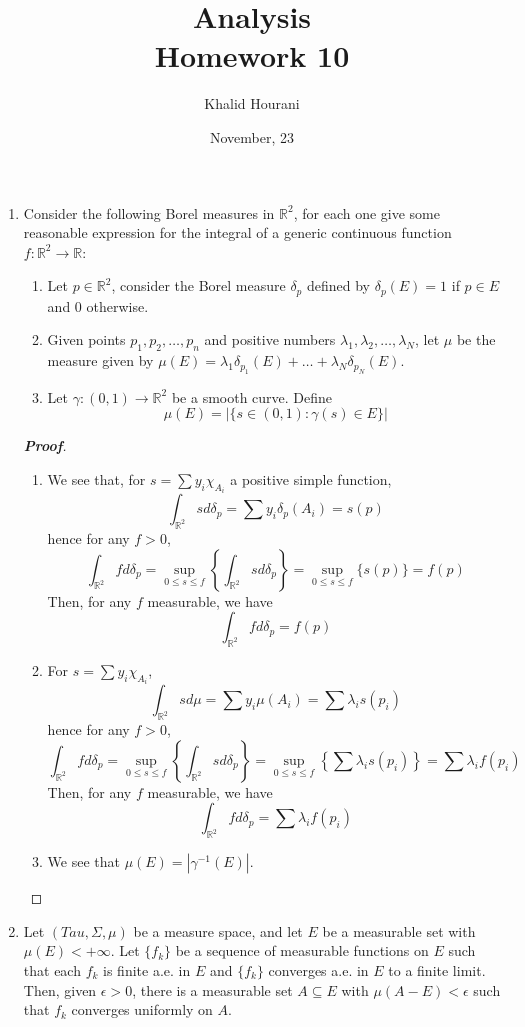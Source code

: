 \documentclass[12pt,leqno]{book}
\title{Analysis\\Homework 10}
\date{November, 23}
\author{Khalid Hourani}
\theoremstyle{definition}
\newcommand{\R}{\mathbb{R}}
\newenvironment{Proof}{\begin{proof}[\textnormal{\textbf{Proof}}]}{\end{proof}}
\begin{document}
\begin{titlepage}
 \maketitle\thispagestyle{empty}
\end{titlepage}
\thispagestyle{empty}
\clearpage\mbox{}\clearpage

\setcounter{page}{1}
\begin{enumerate}
 \item Consider the following Borel measures in $\R^2$, for each one give some reasonable expression for the integral of a generic continuous function $f:\R^2\to\R$:
\begin{enumerate}
 \item Let $p\in\R^2$, consider the Borel measure $\delta_p$ defined by $\delta_p(E)=1$ if $p\in E$ and 0 otherwise.
 \item Given points $p_1,p_2,\hdots,p_n$ and positive numbers $\lambda_1,\lambda_2,\hdots,\lambda_N$, let $\mu$ be the measure given by $\mu(E)=\lambda_1\delta_{p_1}(E)+\hdots+\lambda_N\delta_{p_N}(E)$.
 \item Let $\gamma:(0,1)\to\R^2$ be a smooth curve. Define \[\mu(E)=|\{s\in(0,1):\gamma(s)\in E\}|\] 
\end{enumerate}

\begin{Proof}\indent
 \begin{enumerate}
  \item We see that, for $s=\sum y_i\chi_{A_i}$ a positive simple function, \[\int_{\R^2}sd\delta_p=\sum y_i\delta_p(A_i)=s(p)\] hence for any $f>0$, \[\int_{\R^2}fd\delta_p=\sup_{0\leq s\leq f}\left\{\int_{\R^2}sd\delta_p\right\}=\sup_{0\leq s\leq f}\{s(p)\}=f(p)\] Then, for any $f$ measurable, we have \[\int_{\R^2}fd\delta_p=f(p)\]
  \item For $s=\sum y_i\chi_{A_i}$, \[\int_{\R^2}sd\mu=\sum y_i\mu(A_i)=\sum\lambda_is(p_i)\] hence for any $f>0$, \[\int_{\R^2}fd\delta_p=\sup_{0\leq s\leq f}\left\{\int_{\R^2}sd\delta_p\right\}=\sup_{0\leq s\leq f}\left\{\sum\lambda_is(p_i)\right\}=\sum\lambda_if(p_i)\] Then, for any $f$ measurable, we have \[\int_{\R^2}fd\delta_p=\sum\lambda_if(p_i)\]
  \item We see that $\mu(E)=|\gamma^{-1}(E)|$. 
 \end{enumerate}

\end{Proof}

\item Let $(Tau,\Sigma,\mu)$ be a measure space, and let $E$ be a measurable set with $\mu(E)<+\infty$. Let $\{f_k\}$ be a sequence of measurable functions on $E$ such that each $f_k$ is finite a.e. in $E$ and $\{f_k\}$ converges a.e. in $E$ to a finite limit. Then, given $\epsilon>0$, there is a measurable set $A\subseteq E$ with $\mu(A-E)<\epsilon$ such that $f_k$ converges uniformly on $A$.


\end{enumerate}
\end{document}
